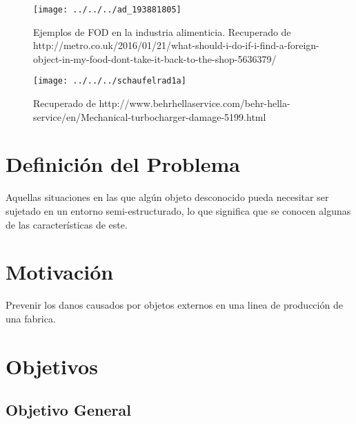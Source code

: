 \begin{figure}
	\centering
	\texttt{[image: ../../../ad\_193881805]}
	\caption[Ejemplos de FOD en la industria alimenticia.]{Ejemplos de FOD en la industria alimenticia.
		Recuperado de http://metro.co.uk/2016/01/21/what-should-i-do-if-i-find-a-foreign-object-in-my-food-dont-take-it-back-to-the-shop-5636379/}
	\label{fig:ad193881805}
\end{figure}
\begin{figure}
	\centering
	\texttt{[image: ../../../schaufelrad1a]}
	\caption{ Recuperado de http://www.behrhellaservice.com/behr-hella-service/en/Mechanical-turbocharger-damage-5199.html}
	\label{fig:schaufelrad1a}
\end{figure}

 
\section{Definición del Problema}

 Aquellas situaciones en las que algún objeto desconocido pueda necesitar ser  sujetado en un entorno semi-estructurado, lo que significa que se conocen algunas de las características de este.

\section{Motivación}
Prevenir los danos causados por objetos externos en una linea de producción de una fabrica.


\section{Objetivos}

\subsection{Objetivo General}

